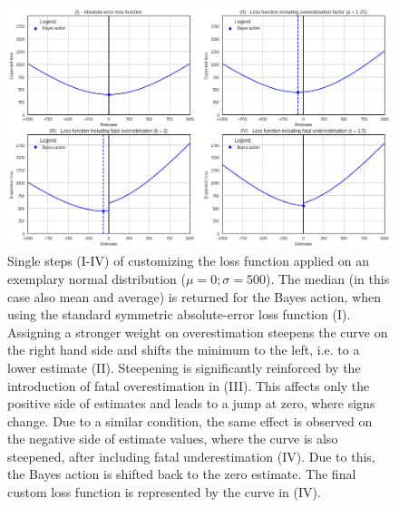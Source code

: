 		\begin{figure}[h]
			\centering
			\includegraphics[width=1\textwidth]{Figures/LF_4steps_normal.png}
			\caption{Single steps (I-IV) of customizing the loss function applied on an exemplary normal distribution ($\mu=0; \sigma=500$). The median (in this case also mean and average) is returned for the Bayes action, when using the standard symmetric absolute-error loss function (I). Assigning a stronger weight on overestimation steepens the curve on the right hand side and shifts the minimum to the left, i.e. to a lower estimate (II). Steepening is significantly reinforced by the introduction of fatal overestimation in (III). This affects only the positive side of estimates and leads to a jump at zero, where signs change. Due to a similar condition, the same effect is observed on the negative side of estimate values, where the curve is also steepened, after including fatal underestimation (IV). Due to this, the Bayes action is shifted back to the zero estimate. The final custom loss function is represented by the curve in (IV).}\label{fig:LF_4steps_normal}
			\centering
		\end{figure}		
